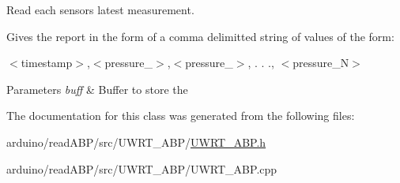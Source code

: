 Read each sensors latest measurement. 

Gives the report in the form of a comma delimitted string of values of the form\+:

$<$timestamp$>$,$<$pressure\+\_$>$,$<$pressure\+\_$>$, . . ., $<$pressure\+\_\+\+N$>$


\begin{DoxyParams}{Parameters}
{\em buff} & Buffer to store the \\
\hline
\end{DoxyParams}


The documentation for this class was generated from the following files\+:\begin{DoxyCompactItemize}
\item 
arduino/read\+A\+B\+P/src/\+U\+W\+R\+T\+\_\+\+A\+B\+P/\hyperlink{UWRT__ABP_8h}{U\+W\+R\+T\+\_\+\+A\+B\+P.\+h}\item 
arduino/read\+A\+B\+P/src/\+U\+W\+R\+T\+\_\+\+A\+B\+P/U\+W\+R\+T\+\_\+\+A\+B\+P.\+cpp\end{DoxyCompactItemize}
